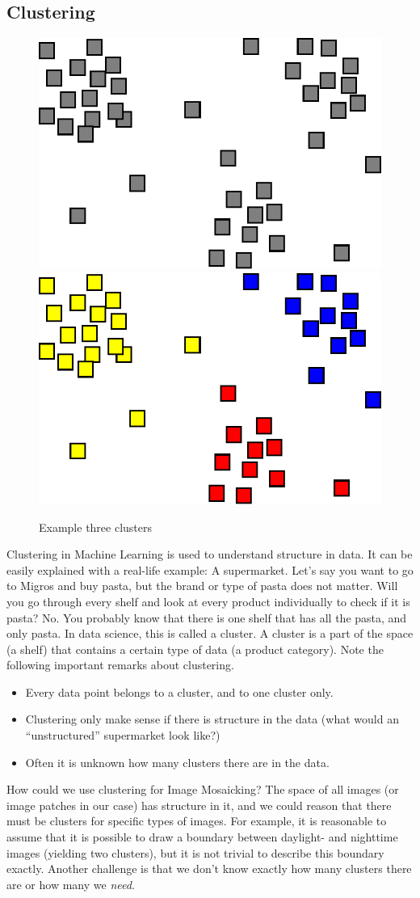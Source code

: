 \documentclass[a4paper]{article}
\begin{document}
	\subsection{Clustering}
		\begin{figure}[tb]
			\centering
			\includegraphics[width=0.45\linewidth]{clustering-wiki-grey}
			\hfill
			\includegraphics[width=0.45\linewidth]{clustering-wiki}
			\caption{Example three clusters}
			\label{fig:clustering-wiki}
		\end{figure}
		
		Clustering in Machine Learning is used to understand structure in data. 
		It can be easily explained with a real-life example: A supermarket.
		Let's say you want to go to Migros and buy pasta, but the brand or type of pasta does not matter.
		Will you go through every shelf and look at every product individually to check if it is pasta? 
		No. 
		You probably know that there is one shelf that has all the pasta, and only pasta.
		In data science, this is called a cluster.
		A cluster is a part of the space (a shelf) that contains a certain type of data (a product category).
		Note the following important remarks about clustering.
		\begin{itemize}
			\item Every data point belongs to a cluster, and to one cluster only.
			\item Clustering only make sense if there is structure in the data (what would an ``unstructured'' supermarket look like?)
			\item Often it is unknown how many clusters there are in the data.
		\end{itemize}
		How could we use clustering for Image Mosaicking?
		The space of all images (or image patches in our case) has structure in it, and we could reason that there must be clusters for specific types of images. For example, it is reasonable to assume that it is possible to draw a boundary between daylight- and nighttime images (yielding two clusters), but it is not trivial to describe this boundary exactly.
		Another challenge is that we don't know exactly how many clusters there are or how many we \emph{need}.
		
\end{document}
